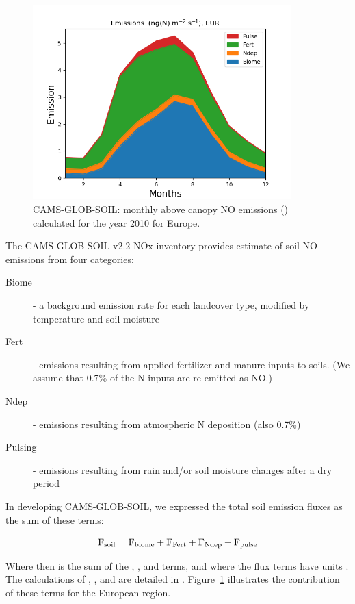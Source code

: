 \begin{figure}[H]
  \centering
   \includegraphics*[width=10cm]{FIGS_UPDATES/PlotRegionalTimeSeriesMonthly_EUR_YLnSMI_Mar2021.png}
  \parbox{10cm}{
  \caption{CAMS-GLOB-SOIL: monthly above canopy NO emissions (\ngN)  calculated for the year 2010
     for Europe.
    \label{fig:SIemis}}
  }
\end{figure}

The CAMS-GLOB-SOIL v2.2 NOx inventory
provides estimate of soil NO emissions from four categories:

\begin{description}
  \item[Biome] - a background emission rate for each landcover type, modified by temperature
and soil moisture %
  \item[Fert] - emissions resulting from applied fertilizer and manure inputs to soils. (We assume
that  0.7\% of the N-inputs are re-emitted as NO.)
  \item[Ndep] - emissions resulting from atmospheric N deposition (also 0.7\%)
  \item[Pulsing] - emissions resulting from rain and/or soil moisture changes after
    a dry period
\end{description}

In developing CAMS-GLOB-SOIL, we expressed the total soil emission fluxes as the sum of these terms:

\begin{equation}
  \mbox{F}_{\scriptsize \mbox{soil}} = \mbox{F}_{\scriptsize \mbox{biome}}  + \mbox{F}_{\scriptsize \mbox{Fert}} + \mbox{F}_{\scriptsize \mbox{Ndep}} + \mbox{F}_{\scriptsize \mbox{pulse}}
  \label{eqn:Fs}
\end{equation}

Where \Fn then is the sum of the \Fb, \Fd, and \Fp terms, and where the
flux terms have units \ngN. The calculations of \Fb, \Ff, \Fd and \Fp
are detailed in \citet{SimpsonDarras:2021}.
Figure~\ref{fig:SIemis} illustrates the contribution of these terms for
the European region. 
%



